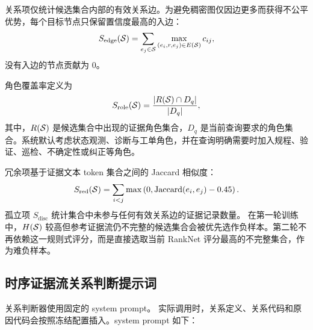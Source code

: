 关系项仅统计候选集合内部的有效关系边。为避免稠密图仅因边更多而获得不公平优势，每个目标节点只保留置信度最高的入边：
\begin{equation}
S_{\mathrm{edge}}(\mathcal{S})
=
\sum_{e_j\in\mathcal{S}}
\max_{(e_i,r,e_j)\in E(\mathcal{S})}c_{ij},
\end{equation}
没有入边的节点贡献为 0。

角色覆盖率定义为
\begin{equation}
S_{\mathrm{role}}(\mathcal{S})
=
\frac{|R(\mathcal{S})\cap D_q|}{|D_q|},
\end{equation}
其中，$R(\mathcal{S})$ 是候选集合中出现的证据角色集合，$D_q$ 是当前查询要求的角色集合。系统默认考虑状态观测、诊断与工单角色，并在查询明确需要时加入规程、验证、巡检、不确定性或纠正等角色。

冗余项基于证据文本 token 集合之间的 Jaccard 相似度：
\begin{equation}
S_{\mathrm{red}}(\mathcal{S})
=
\sum_{i<j}
\max\left(
0,
\operatorname{Jaccard}(e_i,e_j)-0.45
\right).
\end{equation}
孤立项 $S_{\mathrm{disc}}$ 统计集合中未参与任何有效关系边的证据记录数量。
在第一轮训练中，$H(\mathcal{S})$ 较高但参考证据流仍不完整的候选集合会被优先选作负样本。第二轮不再依赖这一规则式评分，而是直接选取当前 RankNet 评分最高的不完整集合，作为难负样本。

\subsection{时序证据流关系判断提示词}
\label{app:relation_prompt}

关系判断器使用固定的 system prompt。
实际调用时，关系定义、关系代码和原因代码会按照冻结配置插入。system prompt 如下：


